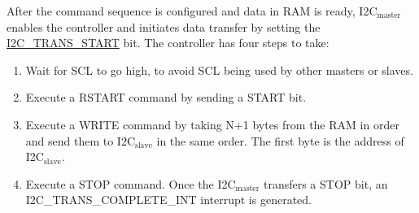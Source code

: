 \documentclass[main\_\_EN.tex]{subfiles}
\begin{document}
After the command sequence is configured and data in RAM is ready, I2C$_\text{master}$ enables the controller and initiates data transfer by setting the \hyperref[fielddesc:I2CTRANSSTART]{I2C\_TRANS\_START} bit. The controller has four steps to take:
\begin{enumerate}
    \item Wait for SCL to go high, to avoid SCL being used by other masters or slaves.
    \item Execute a RSTART command by sending a START bit.
    \item Execute a WRITE command by taking N+1 bytes from the RAM in order and send them to I2C$_\text{slave}$ in the same order. The first byte is the address of I2C$_\text{slave}$.
    \item Execute a STOP command. Once the I2C$_\text{master}$ transfers a STOP bit, an I2C\_TRANS\_COMPLETE\_INT interrupt is generated.
\end{enumerate}
\end{document}
